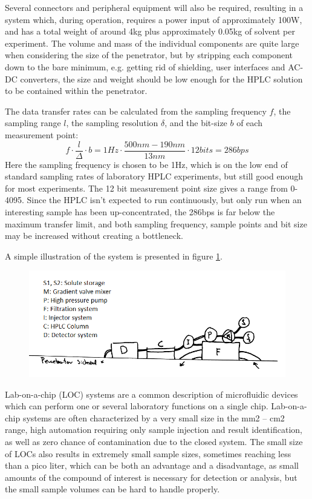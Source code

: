 Several connectors and peripheral equipment will also be required, resulting in a system which, during operation, requires a power input of approximately 100W, and has a total weight of around 4kg plus approximately 0.05kg of solvent per experiment. The volume and mass of the individual components are quite large when considering the size of the penetrator, but by stripping each component down to the bare minimum, e.g. getting rid of shielding, user interfaces and AC-DC converters, the size and weight should be low enough for the HPLC solution to be contained within the penetrator. 

The data transfer rates can be calculated from the sampling frequency $f$, the sampling range $l$, the sampling resolution $\delta$, and the bit-size $b$ of each measurement point:
\begin{equation}
    f \cdot \frac{l}{\Delta} \cdot b = 1Hz \cdot \frac{500nm-190nm}{13nm} \cdot 12bits = 286bps
\end{equation}
Here the sampling frequency is chosen to be 1Hz, which is on the low end of standard sampling rates of laboratory HPLC experiments, but still good enough for most experiments. The 12 bit measurement point size gives a range from 0-4095. Since the HPLC isn’t expected to run continuously, but only run when an interesting sample has been up-concentrated, the 286bps is far below the maximum transfer limit, and both sampling frequency, sample points and bit size may be increased without creating a bottleneck.

A simple illustration of the system is presented in figure \ref{fig:hplc_drawing}.
\begin{figure}[htb]
	\centering
	\includegraphics[width=\textwidth]{figures/mlh/HPLC_system}
	\caption{}
	\label{fig:hplc_drawing}
\end{figure}

Lab-on-a-chip (LOC) systems are a common description of microfluidic devices which can perform one or several laboratory functions on a single chip. Lab-on-a-chip systems are often characterized by a very small size in the mm2 – cm2 range, high automation requiring only sample injection and result identification, as well as zero chance of contamination due to the closed system. The small size of LOCs also results in extremely small sample sizes, sometimes reaching less than a pico liter, which can be both an advantage and a disadvantage, as small amounts of the compound of interest is necessary for detection or analysis, but the small sample volumes can be hard to handle properly. \cite{wiki_loc} \cite{labchip}

